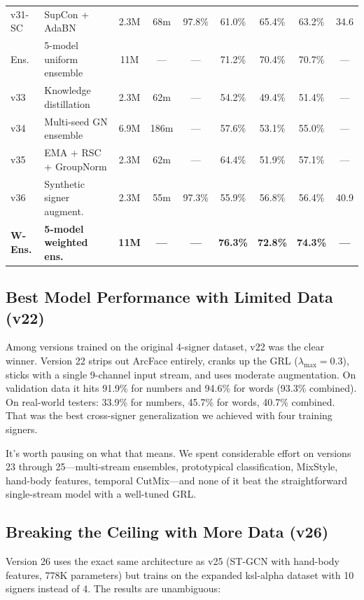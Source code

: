 \documentclass[conference]{IEEEtran}
\begin{document}
\begin{table}[t]
\begin{tabular}{@{}llccccccc@{}}
v31-SC & SupCon + AdaBN & 2.3M & 68m & 97.8\% & 61.0\% & 65.4\% & 63.2\% & 34.6 \\
Ens. & 5-model uniform ensemble & 11M & --- & --- & 71.2\% & 70.4\% & 70.7\% & --- \\
\midrule
v33 & Knowledge distillation & 2.3M & 62m & --- & 54.2\% & 49.4\% & 51.4\% & --- \\
v34 & Multi-seed GN ensemble & 6.9M & 186m & --- & 57.6\% & 53.1\% & 55.0\% & --- \\
v35 & EMA + RSC + GroupNorm & 2.3M & 62m & --- & 64.4\% & 51.9\% & 57.1\% & --- \\
v36 & Synthetic signer augment. & 2.3M & 55m & 97.3\% & 55.9\% & 56.8\% & 56.4\% & 40.9 \\
\textbf{W-Ens.} & \textbf{5-model weighted ens.} & \textbf{11M} & \textbf{---} & \textbf{---} & \textbf{76.3\%} & \textbf{72.8\%} & \textbf{74.3\%} & \textbf{---} \\
\bottomrule
\end{tabular}
\end{table}

\subsection{Best Model Performance with Limited Data (v22)}

Among versions trained on the original 4-signer dataset, v22 was the clear winner. Version 22 strips out ArcFace entirely, cranks up the GRL ($\lambda_{\max} = 0.3$), sticks with a single 9-channel input stream, and uses moderate augmentation. On validation data it hits 91.9\% for numbers and 94.6\% for words (93.3\% combined). On real-world testers: 33.9\% for numbers, 45.7\% for words, 40.7\% combined. That was the best cross-signer generalization we achieved with four training signers.

It's worth pausing on what that means. We spent considerable effort on versions 23 through 25---multi-stream ensembles, prototypical classification, MixStyle, hand-body features, temporal CutMix---and none of it beat the straightforward single-stream model with a well-tuned GRL.

\subsection{Breaking the Ceiling with More Data (v26)}

Version 26 uses the exact same architecture as v25 (ST-GCN with hand-body features, 778K parameters) but trains on the expanded ksl-alpha dataset with 10 signers instead of 4. The results are unambiguous:
\end{document}

